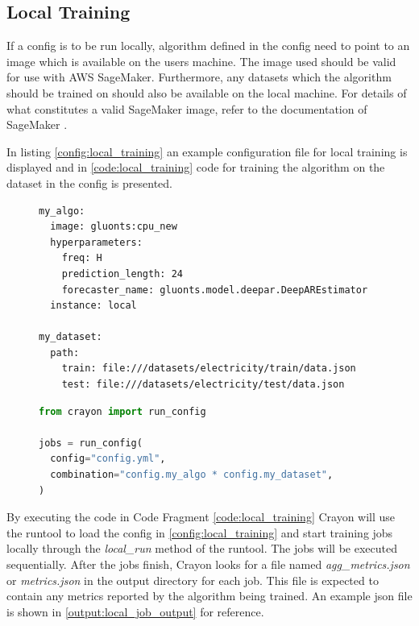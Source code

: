 \subsection{Local Training}
If a config is to be run locally, algorithm defined in the config need to point to an image which is available on the users machine. The image used should be valid for use with AWS SageMaker. Furthermore, any datasets which the algorithm should be trained on should also be available on the local machine. For details of what constitutes a valid SageMaker image, refer to the documentation of SageMaker \cite{sagemaker_docker_documentation}.

In listing \ref{config:local_training} an example configuration file for local training is displayed and in \ref{code:local_training} code for training the algorithm on the dataset in the config is presented.
\begin{figure}[h]
  \begin{lstlisting}[label={config:local_training}, caption={Config file for running local training jobs}]
my_algo:
  image: gluonts:cpu_new
  hyperparameters:
    freq: H
    prediction_length: 24
    forecaster_name: gluonts.model.deepar.DeepAREstimator
  instance: local

my_dataset:
  path:
    train: file:///datasets/electricity/train/data.json
    test: file:///datasets/electricity/test/data.json
  \end{lstlisting}
\end{figure}
\begin{figure}[h]
  \begin{lstlisting}[language=Python, label={code:local_training}, caption={Code for running local training jobs using Crayon}]
from crayon import run_config

jobs = run_config(
  config="config.yml",
  combination="config.my_algo * config.my_dataset",
)
  \end{lstlisting}
\end{figure}


By executing the code in Code Fragment \ref{code:local_training} Crayon will use the runtool to load the config in \ref{config:local_training} and start training jobs locally through the \textit{local\_run} method of the runtool. The jobs will be executed sequentially. After the jobs finish, Crayon looks for a file named \textit{agg\_metrics.json} or \textit{metrics.json} in the output directory for each job. This file is expected to contain any metrics reported by the algorithm being trained. An example json file is shown in \ref{output:local_job_output} for reference.

